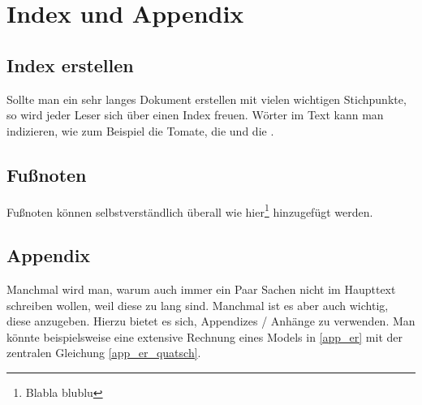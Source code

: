 
\chapter{Index und Appendix}


\section{Index erstellen}

Sollte man ein sehr langes Dokument erstellen mit vielen wichtigen Stichpunkte, so wird jeder Leser sich über einen Index freuen. Wörter im Text kann man indizieren, wie zum Beispiel die Tomate, die  und die .


\section{Fußnoten}

Fußnoten können selbstverständlich überall wie hier\footnote{Blabla blublu} hinzugefügt werden.


\section{Appendix}

Manchmal wird man, warum auch immer ein Paar Sachen nicht im Haupttext schreiben wollen, weil diese zu lang sind. Manchmal ist es aber auch wichtig, diese anzugeben. Hierzu bietet es sich, Appendizes / Anhänge zu verwenden. Man könnte beispielsweise eine extensive Rechnung eines Models in \autoref{app_er} mit der zentralen Gleichung \eqref{app_er_quatsch}.